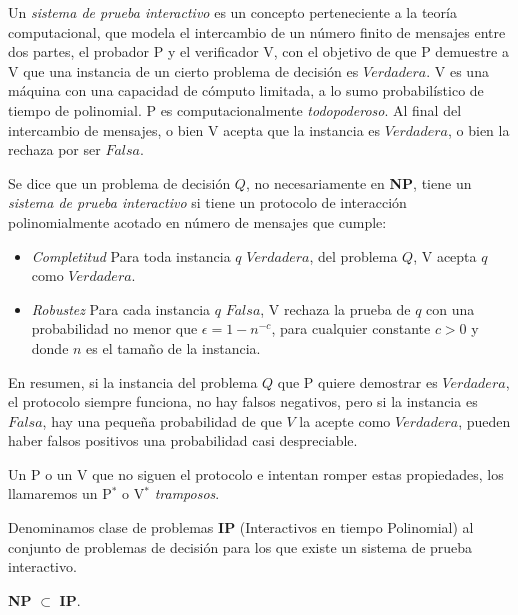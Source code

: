 Un \textit{sistema de prueba interactivo} es un concepto perteneciente a la teoría computacional, que modela el intercambio de un número finito de mensajes entre dos partes, el probador P y el verificador V, con el objetivo de que P demuestre a V que una instancia de un cierto problema de decisión es $Verdadera$. V es una máquina con una capacidad de cómputo limitada, a lo sumo probabilístico de tiempo de polinomial. P es computacionalmente \textit{todopoderoso}. Al final del intercambio de mensajes, o bien V acepta que la instancia es $Verdadera$, o bien la rechaza por ser $Falsa$.

\begin{definition}

	
	Se dice que un problema de decisión $Q$, no necesariamente en \textbf{NP},  tiene un \textit{sistema de prueba interactivo} si tiene un protocolo de interacción polinomialmente acotado en número de mensajes que cumple:
	
	\begin{itemize}
		\item \textit{Completitud} Para toda instancia $q$ $Verdadera$, del problema $Q$, V acepta $q$ como $Verdadera$.
		\item \textit{Robustez} Para cada instancia $q$ $Falsa$, V rechaza la prueba de $q$ con una probabilidad no menor que $\epsilon = 1-n^{-c}$, para cualquier constante $c>0$ y donde $n$ es el tamaño de la instancia.
	\end{itemize}

\end{definition}

En resumen, si la instancia del problema $Q$ que P quiere demostrar es $Verdadera$, el protocolo siempre funciona, no hay falsos negativos, pero si la instancia es $Falsa$, hay una pequeña probabilidad de que $V$ la acepte como $Verdadera$, pueden haber falsos positivos una probabilidad casi despreciable.


Un P o un V que no siguen el protocolo e intentan romper estas propiedades, los llamaremos un P$^*$ o V$^*$ \textit{tramposos}.


\begin{definition}
	Denominamos clase de problemas \textbf{IP} (Interactivos en tiempo Polinomial) al conjunto de problemas de decisión para los que existe un sistema de prueba interactivo.
\end{definition}

\begin{proposition}
	\textbf{NP} $\subset$ \textbf{IP}.
\end{proposition}

